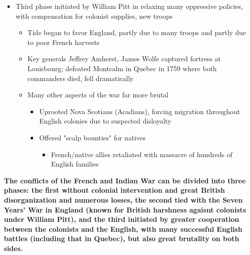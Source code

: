 \documentclass[a4paper]{article}
\begin{document}
{\begin{itemize}
\begin{itemize}
        \end{itemize}
        \item Third phase initiated by William Pitt in relaxing many oppressive policies, with compensation for colonist supplies, new troops
        \begin{itemize}
            \item Tide began to favor England, partly due to many troops and partly due to poor French harvests
            \item Key generals Jeffrey Amherst, James Wolfe captured fortress at Louisbourg; defeated Montcalm in Quebec in 1759 where both commanders died, fell dramatically
            \item Many other aspects of the war far more brutal
            \begin{itemize}
                \item Uprooted Nova Scotians (Acadians), forcing migration throughout English colonies due to suspected disloyalty
                \item Offered "scalp bounties" for natives 
                \begin{itemize}
                    \item French/native allies retaliated with massacre of hundreds of English families
                \end{itemize}
            \end{itemize}
        \end{itemize}
    \end{itemize}
    \textbf{The conflicts of the French and Indian War can be divided into three phases: the first without colonial intervention and great British disorganization and numerous losses, the second tied with the Seven Years' War in England (known for British harshness agaisnt colonists under William Pitt), and the third initiated by greater cooperation between the colonists and the English, with many successful English battles (including that in Quebec), but also great brutality on both sides.}}
\end{document}
